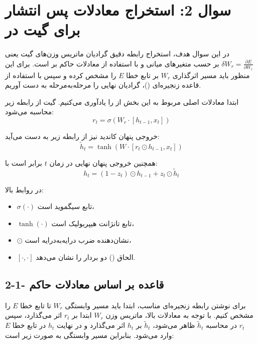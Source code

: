 \documentclass{article}
\begin{document}
\section {سوال 2: استخراج معادلات پس انتشار  برای گیت  در }

در این سوال هدف، استخراج رابطه دقیق گرادیان ماتریس وزن‌های گیت  یعنی
$\delta W_r = \frac{\partial E}{\partial W_r}$
بر حسب متغیرهای میانی و با استفاده از معادلات حاکم بر  است.  
برای این منظور باید مسیر اثرگذاری $W_r$ بر تابع خطا $E$ را مشخص کرده و سپس با استفاده از قاعده زنجیره‌ای ()، گرادیان نهایی را مرحله‌به‌مرحله به دست آوریم.

\vspace{0.3cm}

ابتدا معادلات اصلی مربوط به این بخش از  را یادآوری می‌کنیم. گیت  از رابطه زیر محاسبه می‌شود:
\begin{equation}
	r_t=\sigma\left(W_r \cdot [h_{t-1},x_t]\right)
\end{equation}

خروجی پنهان کاندید نیز از رابطه زیر به دست می‌آید:
\begin{equation}
	\widetilde{h}_t=\tanh\left(W\cdot[r_t\odot h_{t-1},x_t]\right)
\end{equation}

همچنین خروجی پنهان نهایی در زمان $t$ برابر است با:
\begin{equation}
	h_t=(1-z_t)\odot h_{t-1}+z_t\odot \widetilde{h}_t
\end{equation}

در روابط بالا:
\begin{itemize}
	\item $\sigma(\cdot)$ تابع سیگموید است،
	\item $\tanh(\cdot)$ تابع تانژانت هیپربولیک است،
	\item $\odot$ نشان‌دهنده ضرب درایه‌به‌درایه است،
	\item $[\cdot,\cdot]$ الحاق () دو بردار را نشان می‌دهد.
\end{itemize}

\subsection{2-1- قاعده  بر اساس معادلات حاکم}

برای نوشتن رابطه زنجیره‌ای مناسب، ابتدا باید مسیر وابستگی $W_r$ تا تابع خطا $E$ را مشخص کنیم.  
با توجه به معادلات بالا، ماتریس وزن $W_r$ ابتدا بر $r_t$ اثر می‌گذارد، سپس $r_t$ در محاسبه $\widetilde{h}_t$ ظاهر می‌شود، $\widetilde{h}_t$ بر $h_t$ اثر می‌گذارد و در نهایت $h_t$ در تابع خطا $E$ وارد می‌شود. بنابراین مسیر وابستگی به صورت زیر است:
\end{document}
